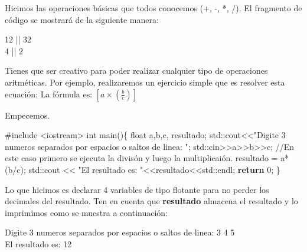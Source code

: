 \documentclass[
  11pt,
  a4paper,
  DIV=11,
  numbers=noendperiod]{scrreprt}
\newenvironment{Shaded}{\begin{snugshade}}{\end{snugshade}}
\newcommand{\BuiltInTok}[1]{\textcolor[rgb]{0.00,0.23,0.31}{#1}}
\newcommand{\CommentTok}[1]{\textcolor[rgb]{0.37,0.37,0.37}{#1}}
\newcommand{\ControlFlowTok}[1]{\textcolor[rgb]{0.00,0.23,0.31}{\textbf{#1}}}
\newcommand{\DataTypeTok}[1]{\textcolor[rgb]{0.68,0.00,0.00}{#1}}
\newcommand{\DecValTok}[1]{\textcolor[rgb]{0.68,0.00,0.00}{#1}}
\newcommand{\ImportTok}[1]{\textcolor[rgb]{0.00,0.46,0.62}{#1}}
\newcommand{\NormalTok}[1]{\textcolor[rgb]{0.00,0.23,0.31}{#1}}
\newcommand{\OperatorTok}[1]{\textcolor[rgb]{0.37,0.37,0.37}{#1}}
\newcommand{\PreprocessorTok}[1]{\textcolor[rgb]{0.68,0.00,0.00}{#1}}
\newcommand{\StringTok}[1]{\textcolor[rgb]{0.13,0.47,0.30}{#1}}
\begin{document}
Hicimos las operaciones básicas que todos conocemos (+, -, *, /). El
fragmento de código se mostrará de la siguiente manera:

\begin{tcolorbox}[custombox]
12 || 32\\
4  || 2
\end{tcolorbox}

Tienes que ser creativo para poder realizar cualquier tipo de
operaciones aritméticas. Por ejemplo, realizaremos un ejercicio simple
que es resolver esta ecuación: La fórmula es:
\([ a \times \left( \frac{b}{c} \right) ]\)

Empecemos.

\begin{Shaded}
\begin{Highlighting}[]
\PreprocessorTok{\#include }\ImportTok{\textless{}iostream\textgreater{}}
\DataTypeTok{int}\NormalTok{ main}\OperatorTok{()\{}
    \DataTypeTok{float}\NormalTok{ a}\OperatorTok{,}\NormalTok{b}\OperatorTok{,}\NormalTok{c}\OperatorTok{,}\NormalTok{ resultado}\OperatorTok{;}
    \BuiltInTok{std::}\NormalTok{cout}\OperatorTok{\textless{}\textless{}}\StringTok{"Digite 3 numeros separados por espacios o saltos de linea: "}\OperatorTok{;}
    \BuiltInTok{std::}\NormalTok{cin}\OperatorTok{\textgreater{}\textgreater{}}\NormalTok{a}\OperatorTok{\textgreater{}\textgreater{}}\NormalTok{b}\OperatorTok{\textgreater{}\textgreater{}}\NormalTok{c}\OperatorTok{;}
    \CommentTok{//En este caso primero se ejecuta la divisón y luego la multiplicaión.}
\NormalTok{    resultado }\OperatorTok{=}\NormalTok{ a}\OperatorTok{*(}\NormalTok{b}\OperatorTok{/}\NormalTok{c}\OperatorTok{);} 
    \BuiltInTok{std::}\NormalTok{cout }\OperatorTok{\textless{}\textless{}} \StringTok{"El resultado es: "}\OperatorTok{\textless{}\textless{}}\NormalTok{resultado}\OperatorTok{\textless{}\textless{}}\BuiltInTok{std::}\NormalTok{endl}\OperatorTok{;}
    \ControlFlowTok{return} \DecValTok{0}\OperatorTok{;}
\OperatorTok{\}}
\end{Highlighting}
\end{Shaded}

Lo que hicimos es declarar 4 variables de tipo flotante para no perder
los decimales del resultado. Ten en cuenta que \textbf{resultado}
almacena el resultado y lo imprimimos como se muestra a continuación:

\begin{tcolorbox}[custombox]
Digite 3 numeros separados por espacios o saltos de linea: 3 4 5 \\
El resultado es: 12
\end{tcolorbox}
\end{document}
